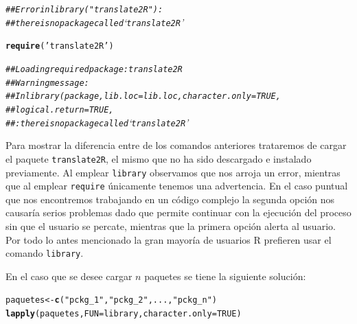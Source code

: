 \documentclass[11pt,a4paper,oneside]{book}\usepackage[]{graphicx}\usepackage[]{color}
\makeatletter
\newcommand{\hlnum}[1]{\textcolor[rgb]{0.686,0.059,0.569}{#1}}%
\newcommand{\hlstr}[1]{\textcolor[rgb]{0.192,0.494,0.8}{#1}}%
\newcommand{\hlcom}[1]{\textcolor[rgb]{0.678,0.584,0.686}{\textit{#1}}}%
\newcommand{\hlstd}[1]{\textcolor[rgb]{0.345,0.345,0.345}{#1}}%
\newcommand{\hlkwb}[1]{\textcolor[rgb]{0.69,0.353,0.396}{#1}}%
\newcommand{\hlkwc}[1]{\textcolor[rgb]{0.333,0.667,0.333}{#1}}%
\newcommand{\hlkwd}[1]{\textcolor[rgb]{0.737,0.353,0.396}{\textbf{#1}}}%
\newenvironment{kframe}{%
 \def\at@end@of@kframe{}%
 \ifinner\ifhmode%
  \def\at@end@of@kframe{\end{minipage}}%
  \begin{minipage}{\columnwidth}%
 \fi\fi%
 \def\FrameCommand##1{\hskip\@totalleftmargin \hskip-\fboxsep
 \colorbox{shadecolor}{##1}\hskip-\fboxsep
     \hskip-\linewidth \hskip-\@totalleftmargin \hskip\columnwidth}%
 \MakeFramed {\advance\hsize-\width
   \@totalleftmargin\z@ \linewidth\hsize
   \@setminipage}}%
 {\par\unskip\endMakeFramed%
 \at@end@of@kframe}
\newenvironment{knitrout}{}{} %
\makeatother
\begin{document}
\begin{itemize}
\begin{knitrout}
\begin{kframe}
\begin{alltt}
\hlcom{## Error in library("translate2R") : }
\hlcom{## there is no package called ‘translate2R’}

\hlkwd{require}\hlstd{(}\hlstr{'translate2R'}\hlstd{)}

\hlcom{## Loading required package: translate2R}
\hlcom{## Warning message:}
\hlcom{## In library(package, lib.loc=lib.loc, character.only=TRUE,}
\hlcom{##          logical.return=TRUE,  }
\hlcom{##         : there is no package called ‘translate2R’}
\end{alltt}
\end{kframe}
\end{knitrout}

Para mostrar la diferencia entre de los comandos anteriores trataremos de cargar el paquete \texttt{translate2R}, el mismo que no ha sido descargado e instalado previamente. Al emplear \texttt{library} observamos que nos arroja un error, mientras que al emplear \texttt{require} únicamente tenemos una advertencia. En el caso puntual que nos encontremos trabajando en un código complejo la segunda opción nos causaría serios problemas dado que permite continuar con la ejecución del proceso sin que el usuario se percate, mientras que la primera opción alerta al usuario. Por todo lo antes mencionado la gran mayoría de usuarios R prefieren usar el comando \texttt{library}.\newline

En el caso que se desee cargar $n$ paquetes se tiene la siguiente solución:
\begin{knitrout}
\color{fgcolor}\begin{kframe}
\begin{alltt}
\hlstd{paquetes} \hlkwb{<-} \hlkwd{c}\hlstd{(}\hlstr{"pckg_1"}\hlstd{,}\hlstr{"pckg_2"}\hlstd{, ... ,} \hlstr{"pckg_n"}\hlstd{)}
\hlkwd{lapply}\hlstd{(paquetes,} \hlkwc{FUN}\hlstd{=library,} \hlkwc{character.only}\hlstd{=}\hlnum{TRUE}\hlstd{)}
\end{alltt}
\end{kframe}
\end{knitrout}


\end{itemize}
\end{document}
